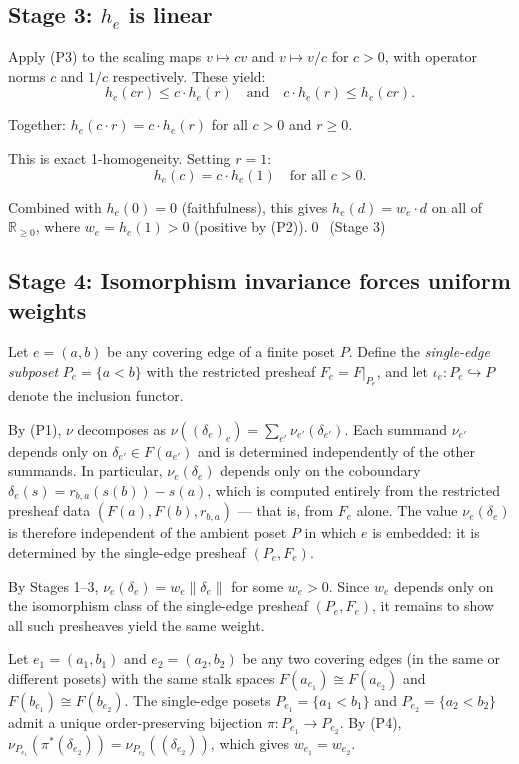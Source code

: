 \documentclass[11pt,a4paper]{amsart}
\theoremstyle{plain}
\theoremstyle{definition}
\begin{document}
\subsection*{Stage 3: $h_e$ is linear}

Apply (P3) to the scaling maps $v \mapsto cv$ and $v \mapsto v/c$ for $c > 0$, with operator norms $c$ and $1/c$ respectively. These yield:
\[
h_e(cr) \leq c \cdot h_e(r) \quad \text{and} \quad c \cdot h_e(r) \leq h_e(cr).
\]

Together: $h_e(c \cdot r) = c \cdot h_e(r)$ for all $c > 0$ and $r \geq 0$.

This is exact 1-homogeneity. Setting $r = 1$:
\[
h_e(c) = c \cdot h_e(1) \quad \text{for all } c > 0.
\]

Combined with $h_e(0) = 0$ (faithfulness), this gives $h_e(d) = w_e \cdot d$ on all of $\mathbb{R}_{\geq 0}$, where $w_e = h_e(1) > 0$ (positive by (P2)).\qed\ (Stage 3)

\subsection*{Stage 4: Isomorphism invariance forces uniform weights}

Let $e = (a, b)$ be any covering edge of a finite poset $P$. Define the \emph{single-edge subposet} $P_e = \{a < b\}$ with the restricted presheaf $F_e = F|_{P_e}$, and let $\iota_e: P_e \hookrightarrow P$ denote the inclusion functor.

By (P1), $\nu$ decomposes as $\nu((\delta_e)_e) = \sum_{e'} \nu_{e'}(\delta_{e'})$. Each summand $\nu_{e'}$ depends only on $\delta_{e'} \in F(a_{e'})$ and is determined independently of the other summands. In particular, $\nu_e(\delta_e)$ depends only on the coboundary $\delta_e(s) = r_{b,a}(s(b)) - s(a)$, which is computed entirely from the restricted presheaf data $(F(a), F(b), r_{b,a})$ --- that is, from $F_e$ alone. The value $\nu_e(\delta_e)$ is therefore independent of the ambient poset $P$ in which $e$ is embedded: it is determined by the single-edge presheaf $(P_e, F_e)$.

By Stages 1--3, $\nu_e(\delta_e) = w_e \|\delta_e\|$ for some $w_e > 0$. Since $w_e$ depends only on the isomorphism class of the single-edge presheaf $(P_e, F_e)$, it remains to show all such presheaves yield the same weight.

Let $e_1 = (a_1, b_1)$ and $e_2 = (a_2, b_2)$ be any two covering edges (in the same or different posets) with the same stalk spaces $F(a_{e_1}) \cong F(a_{e_2})$ and $F(b_{e_1}) \cong F(b_{e_2})$. The single-edge posets $P_{e_1} = \{a_1 < b_1\}$ and $P_{e_2} = \{a_2 < b_2\}$ admit a unique order-preserving bijection $\pi: P_{e_1} \to P_{e_2}$. By (P4), $\nu_{P_{e_1}}(\pi^*(\delta_{e_2})) = \nu_{P_{e_2}}((\delta_{e_2}))$, which gives $w_{e_1} = w_{e_2}$.
\end{document}
